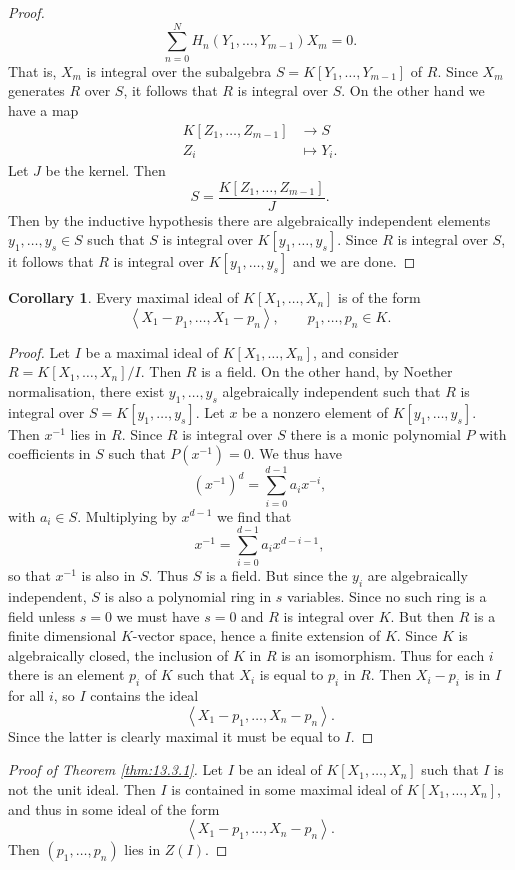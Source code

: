\documentclass{article}
\newcommand{\rb}[1]{\left( #1 \right)}
\renewcommand{\sb}[1]{\left[ #1 \right]}
\newcommand{\ab}[1]{\left\langle #1 \right\rangle}
\theoremstyle{definition}\newtheorem{definition}{Definition}[subsection]
\theoremstyle{definition}\newtheorem{remark}[definition]{Remark}
\theoremstyle{definition}\newtheorem*{example}{Example}
\theoremstyle{definition}\newtheorem*{note}{Note}
\newtheorem{corollary}[definition]{Corollary}
\begin{document}
\begin{proof}
$$ \sum_{n = 0}^N H_n\rb{Y_1, \dots, Y_{m - 1}}X_m = 0. $$
That is, $ X_m $ is integral over the subalgebra $ S = K\sb{Y_1, \dots, Y_{m - 1}} $ of $ R $. Since $ X_m $ generates $ R $ over $ S $, it follows that $ R $ is integral over $ S $. On the other hand we have a map
\begin{align*}
K\sb{Z_1, \dots, Z_{m - 1}} & \to S \\
Z_i & \mapsto Y_i.
\end{align*}
Let $ J $ be the kernel. Then
$$ S = \dfrac{K\sb{Z_1, \dots, Z_{m - 1}}}{J}. $$
Then by the inductive hypothesis there are algebraically independent elements $ y_1, \dots, y_s \in S $ such that $ S $ is integral over $ K\sb{y_1, \dots, y_s} $. Since $ R $ is integral over $ S $, it follows that $ R $ is integral over $ K\sb{y_1, \dots, y_s} $ and we are done.
\end{proof}

\begin{corollary}
Every maximal ideal of $ K\sb{X_1, \dots, X_n} $ is of the form
$$ \ab{X_1 - p_1, \dots, X_1 - p_n} , \qquad p_1, \dots, p_n \in K. $$
\end{corollary}

\begin{proof}
Let $ I $ be a maximal ideal of $ K\sb{X_1, \dots, X_n} $, and consider $ R = K\sb{X_1, \dots, X_n} / I $. Then $ R $ is a field. On the other hand, by Noether normalisation, there exist $ y_1, \dots, y_s $ algebraically independent such that $ R $ is integral over $ S = K\sb{y_1, \dots, y_s} $. Let $ x $ be a nonzero element of $ K\sb{y_1, \dots, y_s} $. Then $ x^{-1} $ lies in $ R $. Since $ R $ is integral over $ S $ there is a monic polynomial $ P $ with coefficients in $ S $ such that $ P\rb{x^{-1}} = 0 $. We thus have
$$ \rb{x^{-1}}^d = \sum_{i = 0}^{d - 1} a_ix^{-i}, $$
with $ a_i \in S $. Multiplying by $ x^{d - 1} $ we find that
$$ x^{-1} = \sum_{i = 0}^{d - 1} a_ix^{d - i - 1}, $$
so that $ x^{-1} $ is also in $ S $. Thus $ S $ is a field. But since the $ y_i $ are algebraically independent, $ S $ is also a polynomial ring in $ s $ variables. Since no such ring is a field unless $ s = 0 $ we must have $ s = 0 $ and $ R $ is integral over $ K $. But then $ R $ is a finite dimensional $ K $-vector space, hence a finite extension of $ K $. Since $ K $ is algebraically closed, the inclusion of $ K $ in $ R $ is an isomorphism. Thus for each $ i $ there is an element $ p_i $ of $ K $ such that $ X_i $ is equal to $ p_i $ in $ R $. Then $ X_i - p_i $ is in $ I $ for all $ i $, so $ I $ contains the ideal
$$ \ab{X_1 - p_1, \dots, X_n - p_n}. $$
Since the latter is clearly maximal it must be equal to $ I $.
\end{proof}

\begin{proof}[Proof of Theorem \ref{thm:13.3.1}]
Let $ I $ be an ideal of $ K\sb{X_1, \dots, X_n} $ such that $ I $ is not the unit ideal. Then $ I $ is contained in some maximal ideal of $ K\sb{X_1, \dots, X_n} $, and thus in some ideal of the form
$$ \ab{X_1 - p_1, \dots, X_n - p_n}. $$
Then $ \rb{p_1, \dots, p_n} $ lies in $ Z\rb{I} $.
\end{proof}
\end{document}
